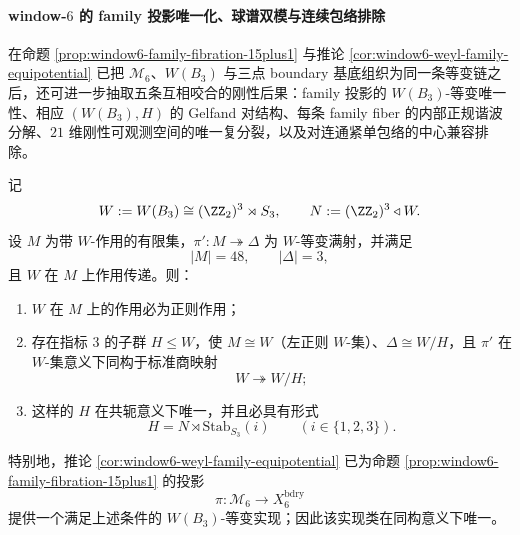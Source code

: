 \paragraph{window-\(6\) 的 family 投影唯一化、球谱双模与连续包络排除}
在命题 \ref{prop:window6-family-fibration-15plus1} 与推论 \ref{cor:window6-weyl-family-equipotential} 已把
\(\mathcal M_6\)、\(W(B_3)\) 与三点 boundary 基底组织为同一条等变链之后，还可进一步抽取五条互相咬合的刚性后果：family 投影的 \(W(B_3)\)-等变唯一性、相应 \((W(B_3),H)\) 的 Gelfand 对结构、每条 family fiber 的内部正规谐波分解、\(21\) 维刚性可观测空间的唯一复分裂，以及对连通紧单包络的中心兼容排除。

\begin{theorem}\label{thm:window6-family-projection-wequivariant-uniqueness}
记
\[
W:=W(B_3)\cong (\ZZ_2)^3\rtimes S_3,
\qquad
N:=(\ZZ_2)^3\triangleleft W.
\]
设 \(M\) 为带 \(W\)-作用的有限集，\(\pi':M\twoheadrightarrow \Delta\) 为 \(W\)-等变满射，并满足
\[
|M|=48,
\qquad
|\Delta|=3,
\]
且 \(W\) 在 \(M\) 上作用传递。则：
\begin{enumerate}
  \item \(W\) 在 \(M\) 上的作用必为正则作用；
  \item 存在指标 \(3\) 的子群 \(H\le W\)，使 \(M\cong W\)（左正则 \(W\)-集）、\(\Delta\cong W/H\)，且 \(\pi'\) 在 \(W\)-集意义下同构于标准商映射
  \[
  W\twoheadrightarrow W/H;
  \]
  \item 这样的 \(H\) 在共轭意义下唯一，并且必具有形式
  \[
  H=N\rtimes \mathrm{Stab}_{S_3}(i)
  \qquad (i\in\{1,2,3\}).
  \]
\end{enumerate}
特别地，推论 \ref{cor:window6-weyl-family-equipotential} 已为命题 \ref{prop:window6-family-fibration-15plus1} 的投影
\[
\pi:\mathcal M_6\longrightarrow X_6^{\mathrm{bdry}}
\]
提供一个满足上述条件的 \(W(B_3)\)-等变实现；因此该实现类在同构意义下唯一。
\end{theorem}
